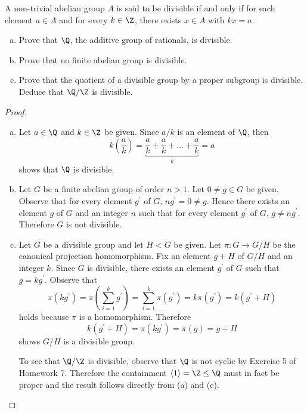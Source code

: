 \documentclass[10pt]{amsart}
\begin{document}
\begin{thm}
  A non-trivial abelian group $A$ is said to be divisible if and only if for each element $a \in A$ and for every $k \in \Z$, there exists $x \in A$ with $kx = a$.
  \begin{enumerate}[(a)]
  \item
    Prove that $\Q$, the additive group of rationals, is divisible.
  \item
    Prove that no finite abelian group is divisible.
  \item
    Prove that the quotient of a divisible group by a proper subgroup is divisible.
    Deduce that $\Q/\Z$ is divisible.
  \end{enumerate}
  \begin{proof}
    \begin{enumerate}[(a)]
    \item
      Let $a \in \Q$ and $k \in \Z$ be given.
      Since $a/k$ is an element of $\Q$, then $$k\left(\frac{a}{k}\right) = \underbrace{\frac{a}{k} + \frac{a}{k} + \ldots + \frac{a}{k}}_{k} = a$$
      shows that $\Q$ is divisible.
    \item
      Let $G$ be a finite abelian group of order $n > 1$.
      Let $0 \not = g \in G$ be given.
      Observe that for every element $g^\prime$ of $G$, $ng^\prime = 0 \not = g$.
      Hence there exists an element $g$ of $G$ and an integer $n$ such that for every element $g^\prime$ of $G$, $g \not = ng^\prime$.
      Therefore $G$ is not divisible.
    \item
      Let $G$ be a divisible group and let $H < G$ be given.
      Let $\pi \colon G \rightarrow G/H$ be the canonical projection homomorphism.
      Fix an element $g + H$ of $G/H$ and an integer $k$.
      Since $G$ is divisible, there exists an element $g^\prime$ of $G$ such that $g = kg^\prime$.
      Observe that $$\pi(kg^\prime) = \pi\left(\sum_{i=1}^k g^\prime\right) = \sum_{i=1}^k\pi\left(g^\prime\right) = k\pi\left(g^\prime\right) = k(g^\prime + H)$$ holds because $\pi$ is a homomorphism.
      Therefore
      $$k(g^\prime + H) = \pi(kg^\prime) =  \pi(g) = g + H$$
      shows $G/H$ is a divisible group.
      
      To see that $\Q/\Z$ is divisible, observe that $\Q$ is not cyclic by Exercise 5 of Homework 7.
      Therefore the containment $\left< 1 \right> = \Z \leq \Q$ must in fact be proper and the result follows directly from (a) and (c).
    \end{enumerate}
  \end{proof}
\end{thm}
\end{document}
